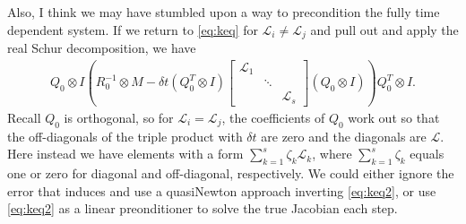 \documentclass[a4paper,10pt]{article}
\begin{document}
Also, I think we may have stumbled upon a way to precondition the fully time
dependent system. If we return to \eqref{eq:keq} for $\mathcal{L}_i\neq\mathcal{L}_j$
and pull out and apply the real Schur decomposition, we have
\begin{align}\label{eq:keq2}
Q_0\otimes I\left( R_0^{-1}\otimes M - \delta t (Q_0^T\otimes I)
	\begin{bmatrix} \mathcal{L}_1  & \\ & \ddots \\ && \mathcal{L}_s\end{bmatrix}
	(Q_0\otimes I)\right)Q_0^T\otimes I.
\end{align}
%
Recall $Q_0$ is orthogonal, so for $\mathcal{L}_i = \mathcal{L}_j$, the coefficients
of $Q_0$ work out so that the off-diagonals of the triple product with $\delta t$
are zero and the diagonals are $\mathcal{L}$. Here instead we have elements with a
form $\sum_{k=1}^s \zeta_k\mathcal{L}_k$, where $\sum_{k=1}^s \zeta_k$ equals one
or zero for diagonal and off-diagonal, respectively. We could either ignore the error
that induces and use a quasiNewton approach inverting \eqref{eq:keq2}, or use
\eqref{eq:keq2} as a linear preonditioner to solve the true Jacobian each step.
\end{document}
